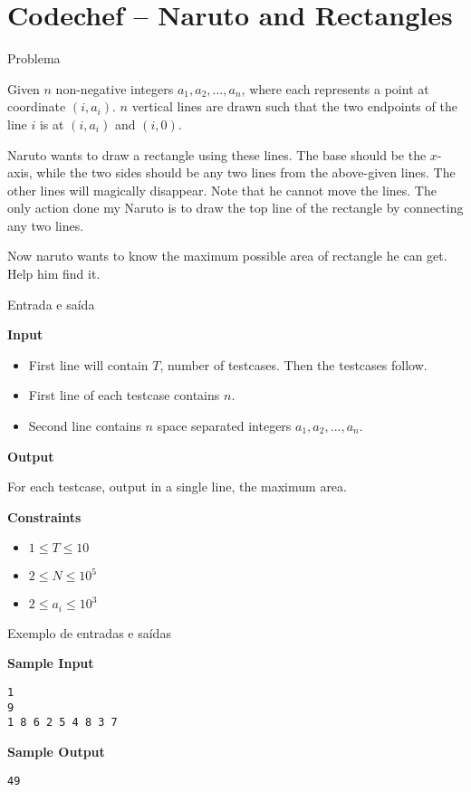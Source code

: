 \section{Codechef -- Naruto and Rectangles}

\begin{frame}[fragile]{Problema}

Given $n$ non-negative integers $a_1, a_2, \ldots, a_n$, where each represents a point at 
coordinate $(i, a_i)$. $n$ vertical lines are drawn such that the two endpoints of the line $i$ is
at $(i, a_i)$ and $(i, 0)$.

Naruto wants to draw a rectangle using these lines. The base should be the $x$-axis, while the 
two sides should be any two lines from the above-given lines. The other lines will magically 
disappear. Note that he cannot move the lines. The only action done my Naruto is to draw the top 
line of the rectangle by connecting any two lines.

Now naruto wants to know the maximum possible area of rectangle he can get. Help him find it.
\end{frame}

\begin{frame}[fragile]{Entrada e saída}

\textbf{Input}

\begin{itemize}
    \item First line will contain $T$, number of testcases. Then the testcases follow.
    \item First line of each testcase contains $n$.
    \item Second line contains $n$ space separated integers $a_1, a_2, \ldots, a_n$.
\end{itemize}

\textbf{Output}

For each testcase, output in a single line, the maximum area.

\textbf{Constraints}

\begin{itemize}
    \item $1 \leq T \leq 10$
    \item $2 \leq N \leq 10^5$
    \item $2 \leq a_i \leq 10^3$
\end{itemize}

\end{frame}

\begin{frame}[fragile]{Exemplo de entradas e saídas}

\begin{minipage}[t]{0.5\textwidth}
\textbf{Sample Input}
\begin{verbatim}
1
9
1 8 6 2 5 4 8 3 7
\end{verbatim}
\end{minipage}
\begin{minipage}[t]{0.45\textwidth}
\textbf{Sample Output}
\begin{verbatim}
49
\end{verbatim}
\end{minipage}
\end{frame}

